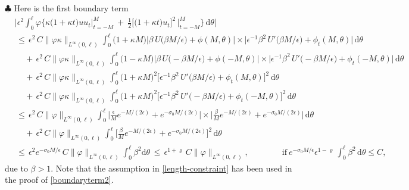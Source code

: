 \documentclass[10pt, reqno]{amsart}
\numberwithin{equation}{section}
\theoremstyle{definition}
\begin{document}
{{\smallskip
\noindent$\clubsuit$ Here is the first boundary term
\begin{align} \label{boundaryterm2}
 &\Bigg|\epsilon^2 \int_0^\ell\varphi\Bigg\{\kappa\big(1+\kappa t\big) u u_t \Big|_{t=-{M}}^{M}
 \ +\
 \frac{1}{2} \Big[ \big(1+\kappa t\big) u_t \Big]^2\, \Big|_{t=-{M}}^{M}\Bigg\} \,{\mathrm d}\theta\Bigg|
\nonumber\\[2mm]
 &\,\leq\, \epsilon^2\,C \|\varphi\kappa\|_{L^\infty(0,\ell)}\int_0^\ell\big(1+\kappa M\big)
 \Big|\beta \, U\big( \beta M/\epsilon\big) +\phi(M, \theta) \Big|
 \times\Big|\epsilon^{-1}\beta^2\, U'\big( \beta M/\epsilon\big) +\phi_t(M, \theta) \Big|
 \,{\mathrm d}\theta
\nonumber\\[2mm]
 &\quad\,+\, \epsilon^2\,C \|\varphi\kappa\|_{L^\infty(0,\ell)}\int_0^\ell\big(1-\kappa M\big)
 \Big|\beta \, U\big( -\beta M/\epsilon\big) +\phi(-M, \theta)\Big|
 \times\Big|\epsilon^{-1}\beta^2\, U'\big( -\beta M/\epsilon\big) +\phi_t(-M, \theta) \Big|
 \,{\mathrm d}\theta
\nonumber\\[2mm]
 &\quad\,+\, \epsilon^2\,C \|\varphi\kappa\|_{L^\infty(0,\ell)}\int_0^\ell\big(1+\kappa M\big)^2
 \Big[\epsilon^{-1}\beta^2\, U'\big( \beta M/\epsilon\big) +\phi_t(M, \theta) \Big]^2
 \,{\mathrm d}\theta
\nonumber\\[2mm]
 &\quad\,+\, \epsilon^2\,C \|\varphi\kappa\|_{L^\infty(0,\ell)}\int_0^\ell\big(1+\kappa M\big)^2
 \Big[\epsilon^{-1}\beta^2\, U'\big(-\beta M/\epsilon\big) +\phi_t(-M, \theta) \Big]^2
 \,{\mathrm d}\theta
\nonumber\\[2mm]
 &\,\leq\, \epsilon^2\,C \|\varphi\|_{L^\infty(0,\ell)}\int_0^\ell
 \Big|\frac{\epsilon}{M}e^{-M/(2\epsilon)} +e^{-\sigma_0M/(2\epsilon)} \Big|
 \times\Big|\frac{\beta}{M}e^{-M/(2\epsilon)} +e^{-\sigma_0M/(2\epsilon)} \Big|
 \,{\mathrm d}\theta
\nonumber\\[2mm]
 &\quad\,+\, \epsilon^2\,C \|\varphi\|_{L^\infty(0,\ell)}\int_0^\ell
 \Big[\frac{\beta}{M}e^{-M/(2\epsilon)} +e^{-\sigma_0M/(2\epsilon)} \Big]^2
 \,{\mathrm d}\theta
\nonumber\\[2mm]
 &\,\leq\, \epsilon^2 e^{-\sigma_0 M/\epsilon}\,C \|\varphi\|_{L^\infty(0,\ell)}\displaystyle\int_0^{\ell}\beta^2 {\mathrm d}\theta
 \,\leq\, \epsilon^{1+\varrho}\,C \|\varphi\|_{L^\infty(0,\ell)},
 \qquad\qquad \mbox{if}\ e^{-\sigma_0 M/\epsilon}\epsilon^{1-\varrho}\,\int_0^\ell \beta^2\,{\mathrm d}\theta\leq C,
\end{align}
 due to $\beta>1$. Note that the assumption in \eqref{length-constraint} has been used in the proof of \eqref{boundaryterm2}.

}}
\end{document}
